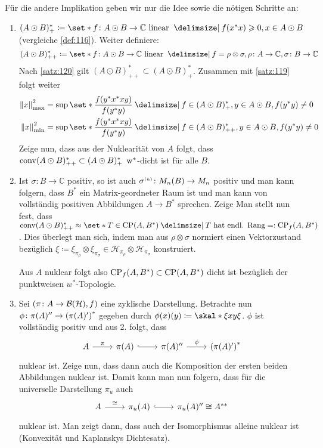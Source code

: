 \begin{beweis}
	Für die andere Implikation geben wir nur die Idee sowie die nötigen Schritte an: 
	\begin{enumerate}[1.]
		\item $(A \odot B)^*_+ \coloneqq \set*{f \colon A \odot B \to \mathbb{C} \text{ linear } \given f(x^*x)\ge 0, x \in A \odot B}$ (vergleiche \autoref{def:116}).
		Weiter definiere:
		\[
			(A \odot B)^*_{++} \coloneqq \set*{f \colon A \odot B \to \mathbb{C} \text{ linear }  \given f =  \rho \otimes \sigma, \rho \colon A \to \mathbb{C}, \sigma\colon B \to \mathbb{C}}
		\]
		Nach \autoref{satz:120} gilt $(A \odot B)^*_{++} \subset (A \odot B)^*_{+}$.
		Zusammen mit \autoref{satz:119} folgt weiter
		\begin{align}
			\norm*{x}_{\max}^2 &= \sup \set*{\frac{f(y^*x^*xy)}{f(y^*y)} \given f \in (A \odot B)^*_+, y \in A \odot B, f(y^*y)\neq 0} \\
			\norm*{x}_{\min}^2 &= \sup \set*{\frac{f(y^*x^*xy)}{f(y^*y)} \given f \in (A \odot B)^*_{++}, y \in A \odot B, f(y^*y)\neq 0} \\
		\end{align}
		Zeige nun, dass aus der Nuklearität von $A$ folgt, dass $\conv (A \odot B)_{++}^* \subset (A \odot B)_+^*$ $\w^*$-dicht ist für alle $B$.
		\item Ist $\sigma \colon B \to \mathbb{C}$ positiv, so ist auch $\sigma^\ssbrace{n} \colon M_n(B)\to M_n$ positiv und man kann folgern, dass $B^*$ ein Matrix-geordneter Raum ist und man kann von vollständig positiven Abbildungen $A \to B^*$ sprechen.
		Zeige 
		Man stellt nun fest, dass $\conv(A \odot B)^*_{++} \approx \set*{T \in \CP(A,B^*) \given T \text{ hat endl. Rang}} =: \CP_f(A,B^*)$.
		Dies überlegt man sich, indem man aus $\rho \otimes \sigma$ normiert einen Vektorzustand bezüglich $\xi \coloneqq \xi_{\pi_\rho} \otimes \xi_{\pi_\sigma} \in \mathcal{H}_{\pi_\rho} \otimes \mathcal{H}_{\pi_\sigma}$ konstruiert.
		
		Aus $A$ nuklear folgt also $\CP_f(A,B^*) \subset \CP(A,B^*)$ dicht ist bezüglich der punktweisen $w^*$-Topologie.
		\item Sei $\enbrace*{\pi \colon A \to \mathcal{B}(\mathcal{H}),f}$ eine zyklische Darstellung.
		Betrachte nun $\phi \colon \pi(A)'' \to \enbrace*{\pi(A)'}^*$ gegeben durch $\phi(x)(y) \coloneqq \skal*{\xi}{xy \xi}$.
		$\phi$ ist vollständig positiv und aus 2. folgt, dass
		\[
			\begin{tikzcd}
				A \rar["\pi"] & \pi(A) \rar[hook] & \pi(A)'' \rar["\phi"] & \enbrace*{\pi(A)'}^*
			\end{tikzcd}
		\]
		nuklear ist.
		Zeige nun, dass dann auch die Komposition der ersten beiden Abbildungen nuklear ist.
		Damit kann man nun folgern, dass für die universelle Darstellung $\pi_u$ auch
		\[
			\begin{tikzcd}
				A \rar["\cong"] & \pi_u(A) \rar[hook] & \pi_u(A)'' \cong A^{**}
			\end{tikzcd}
		\]
		nuklear ist.
		Man zeigt dann, dass auch der Isomorphismus alleine nuklear ist (Konvexität und Kaplanskys Dichtesatz).\qedhere
	\end{enumerate}
\end{beweis}
